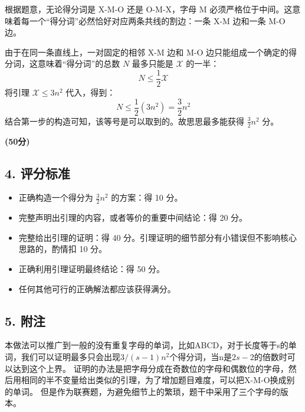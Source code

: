 \documentclass[zihao=5, a4paper]{ctexart}
\newcommand{\scoreB}[1]{\par\dotfill \textbf{(#1分)}\\}
\begin{document}
\vspace{1em}

根据题意，无论得分词是 X-M-O 还是 O-M-X，字母 M 必须严格位于中间。这意味着每一个“得分词”必然恰好对应两条共线的割边：一条 X-M 边和一条 M-O 边。

由于在同一条直线上，一对固定的相邻 X-M 边和 M-O 边只能组成一个确定的得分词，这意味着“得分词”的总数 $N$ 最多只能是 $\mathcal{X}$ 的一半：
\[
N \le \frac{1}{2} \mathcal{X}
\]
将引理 $\mathcal{X} \le 3n^2$ 代入，得到：
\[
N \le \frac{1}{2} (3n^2) = \frac{3}{2}n^2
\]
结合第一步的构造可知，该等号是可以取到的。故思思最多能获得 $\frac{3}{2}n^2$ 分。

\scoreB{50}






\subsection*{4. 评分标准}
\begin{itemize}
    \item 正确构造一个得分为 $\frac{3}{2}n^2$ 的方案：得 10 分。
    \item 完整声明出引理的内容，或者等价的重要中间结论：得 20 分。
    \item 完整给出引理的证明：得 40 分。引理证明的细节部分有小错误但不影响核心思路的，酌情扣 10 分。
    \item 正确利用引理证明最终结论：得 50 分。
    \item 任何其他可行的正确解法都应该获得满分。
\end{itemize}

\subsection*{5. 附注}
本做法可以推广到一般的没有重复字母的单词，比如ABCD，对于长度等于s的单词，我们可以证明最多只会出现$3/(s-1)n^2$个得分词，当n是$2s-2$的倍数时可以达到这个上界。
证明的办法是把字母分成在奇数位的字母和偶数位的字母，然后用相同的半不变量给出类似的引理，为了增加题目难度，可以把X-M-O换成别的单词。
但是作为联赛题，为避免细节上的繁琐，题干中采用了三个字母的版本。
\end{document}
